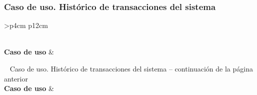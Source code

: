 
\subsubsection{Caso de uso. Histórico de transacciones del sistema} \label{sec:cu_transacciones-sistema}
\begin{longtable}{
    >{}p{4cm}
    p{12cm}
    }
    \caption{Caso de uso. Histórico de transacciones del sistema} \label{table:cu_transacciones-sistema} \\
    \toprule
    \textbf{Caso de uso} &  \\
    \endfirsthead
    
    {{ \tablename\ \thetable{} Caso de uso. Histórico de transacciones del sistema -- continuación de la página anterior}} \\
    \toprule
    \textbf{Caso de uso} &  \\
    \midrule
    \endhead
    
    \midrule
     \\ 
    \endfoot
    
    \bottomrule
    \endlastfoot
    

\end{longtable}
